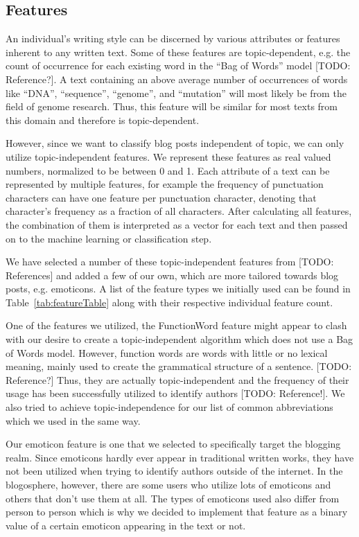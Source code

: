 \subsection{Features}
\label{sec:features}

An individual's writing style can be discerned by various attributes or features inherent to any written text.
Some of these features are topic-dependent, e.g. the count of occurrence for each existing word in the “Bag of Words” model [TODO: Reference?].
A text containing an above average number of occurrences of words like “DNA”, “sequence”, “genome”, and “mutation” will most likely be from the field of genome research.
Thus, this feature will be similar for most texts from this domain and therefore is topic-dependent.


However, since we want to classify blog posts independent of topic, we can only utilize topic-independent features.
We represent these features as real valued numbers, normalized to be between 0 and 1.
Each attribute of a text can be represented by multiple features, for example the frequency of punctuation characters can have one feature per punctuation character, denoting that character's frequency as a fraction of all characters.
After calculating all features, the combination of them is interpreted as a vector for each text and then passed on to the machine learning or classification step.


We have selected a number of these topic-independent features from [TODO: References] and added a few of our own, which are more tailored towards blog posts, e.g. emoticons.
A list of the feature types we initially used can be found in Table~\ref{tab:featureTable} along with their respective individual feature count.


One of the features we utilized, the FunctionWord feature might appear to clash with our desire to create a topic-independent algorithm which does not use a Bag of Words model.
However, function words are words with little or no lexical meaning, mainly used to create the grammatical structure of a sentence. [TODO: Reference?]
Thus, they are actually topic-independent and the frequency of their usage has been successfully utilized to identify authors [TODO: Reference!].
We also tried to achieve topic-independence for our list of common abbreviations which we used in the same way.


Our emoticon feature is one that we selected to specifically target the blogging realm.
Since emoticons hardly ever appear in traditional written works, they have not been utilized when trying to identify authors outside of the internet.
In the blogosphere, however, there are some users who utilize lots of emoticons and others that don't use them at all.
The types of emoticons used also differ from person to person which is why we decided to implement that feature as a binary value of a certain emoticon appearing in the text or not.


